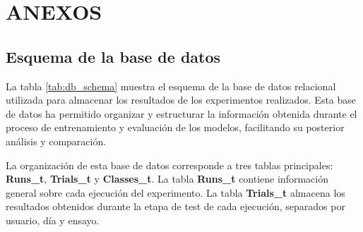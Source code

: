 \section*{ANEXOS} \label{sec:anexos} %

\renewcommand{\thesubsection}{\Alph{subsection}} %
\renewcommand{\thetable}{\Alph{subsection}.\arabic{table}}
\renewcommand{\thefigure}{\Alph{subsection}.\arabic{figure}}
\renewcommand{\thecode}{\Alph{subsection}.\arabic{code}}
\setcounter{subsection}{0} %
\subsection{Esquema de la base de datos} \label{sec:db_schema}

La tabla \ref{tab:db_schema} muestra el esquema de la base de datos relacional utilizada para almacenar los resultados de los experimentos realizados. Esta base de datos ha permitido organizar y estructurar la información obtenida durante el proceso de entrenamiento y evaluación de los modelos, facilitando su posterior análisis y comparación.

La organización de esta base de datos corresponde a tres tablas principales: \textbf{Runs\_t}, \textbf{Trials\_t} y \textbf{Classes\_t}. La tabla \textbf{Runs\_t} contiene información general sobre cada ejecución del experimento. La tabla \textbf{Trials\_t} almacena los resultados obtenidos durante la etapa de test de cada ejecución, separados por usuario, día y ensayo.

